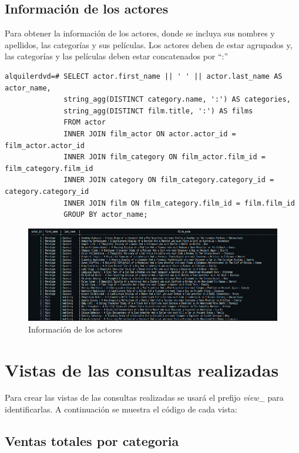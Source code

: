 \documentclass{report}
\begin{document}
\section{Información de los actores}
Para obtener la información de los actores, donde se incluya sus nombres y
apellidos, las categorías y sus películas. Los actores deben de estar
agrupados y, las categorías y las películas deben estar concatenados por
“:”
\begin{verbatim}
alquilerdvd=# SELECT actor.first_name || ' ' || actor.last_name AS actor_name,
              string_agg(DISTINCT category.name, ':') AS categories,
              string_agg(DISTINCT film.title, ':') AS films
              FROM actor
              INNER JOIN film_actor ON actor.actor_id = film_actor.actor_id
              INNER JOIN film_category ON film_actor.film_id = film_category.film_id
              INNER JOIN category ON film_category.category_id = category.category_id
              INNER JOIN film ON film_category.film_id = film.film_id
              GROUP BY actor_name;
\end{verbatim}
\begin{figure}[H]
  \centering
  \includegraphics[scale=0.60]{img/querie_d.png}
  \caption{Información de los actores}
  \label{fig:información de los actores}
\end{figure}

\cleardoublepage

\chapter{Vistas de las consultas realizadas}
Para crear las vistas de las consultas realizadas se usará el prefijo \emph{view\_} para identificarlas. A continuación se muestra el código de cada vista:

\section{Ventas totales por categoria}
\end{document}
